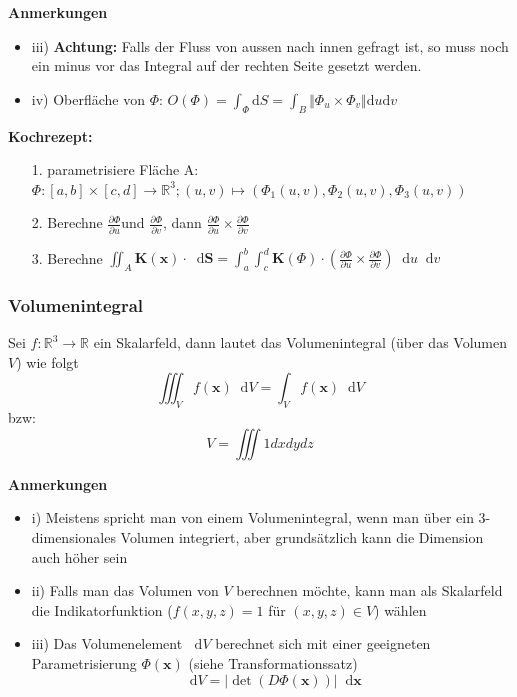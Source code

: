 \documentclass[8pt, a4paper, landscape, fleqn]{scrartcl}
\newenvironment {annotation}[1]
				{\begin{itshape} \begin{small} \textbf{#1} \begin{itemize}}
				{\end{itemize} \end{small} \end{itshape}}
\def\d{\text{d}}
\providecommand{\diff}{\mathop{} \! \mathrm{d}}
\begin{document}
\begin{multicols*}{3}
\begin{itemize}
\begin{annotation}{Anmerkungen}
							\item[iii)] \textbf{Achtung: }Falls der Fluss von aussen nach innen gefragt ist, so muss noch ein minus vor das Integral auf der rechten Seite gesetzt werden.
							\item[iv)] Oberfläche von $\Phi$: $O(\Phi) = \int_\Phi \d S = \int_B \Vert \Phi_u \times \Phi_v \Vert \d u \d v$
						\end{annotation}
						\textbf{Kochrezept:}
						\begin{itemize}
						    \item[1.] parametrisiere Fläche A: $\Phi : [a,b]\times [c,d] \rightarrow \mathbb{R}^3; (u,v) \mapsto (\Phi_1(u,v),\Phi_2(u,v),\Phi_3(u,v))$
						    \item[2.] Berechne $\frac{\partial \Phi}{\partial u}$und $ \frac{\partial \Phi}{\partial v}$, dann $\frac{\partial \Phi}{\partial u} \times \frac{\partial \Phi}{\partial v}$
						    \item[3.] Berechne $\iint_A \textbf{K}(\textbf{x})  \cdot \diff \textbf{S} = \int_a^b \int_c^d \textbf{K}(\Phi) \cdot \left ( \frac{\partial \Phi}{\partial u} \times \frac{\partial \Phi}{\partial v} \right) \diff u \diff v$
						\end{itemize}
					\end{itemize}
					
					
				\subsubsection{Volumenintegral}
					Sei $f: \mathbb{R}^3 \rightarrow \mathbb{R}$ ein Skalarfeld, dann lautet das Volumenintegral (über das Volumen $V$) wie folgt
					\[ \iiint_V f(\textbf{x}) \diff V = \int_V f(\textbf{x}) \diff V \]
					bzw: \[V = \iiint 1dxdydz\]
					\begin{annotation}{Anmerkungen}
						\item[i)] Meistens spricht man von einem Volumenintegral, wenn man über ein 3-dimensionales Volumen integriert, aber grundsätzlich kann die Dimension auch höher sein
						\item[ii)] Falls man das Volumen von $V$ berechnen möchte, kann man als Skalarfeld die Indikatorfunktion ($f(x, y, z) = 1$ für $(x, y, z) \in V$) wählen
						\item[iii)] Das Volumenelement $\diff V$ berechnet sich mit einer geeigneten Parametrisierung $\Phi(\textbf{x})$ (siehe Transformationssatz)
						\[ \diff V = \vert \det(D\Phi(\textbf{x}))\vert \diff \textbf{x}\]
					\end{annotation}	

\end{multicols*}
\end{document}
